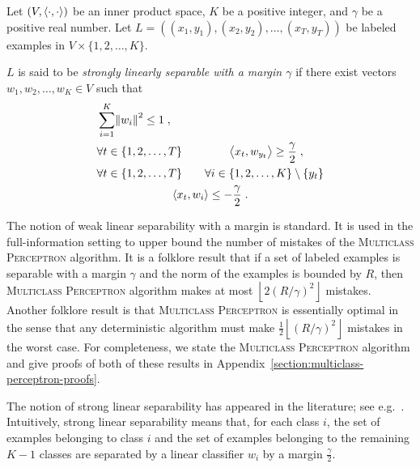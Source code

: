 \begin{definition}
\label{definition:strong-linear-separability}
Let $(V,\left\langle \cdot, \cdot \right\rangle)$ be an inner product space, $K$ be a positive
integer, and $\gamma$ be a positive real number. Let $L = ((x_1, y_1), (x_2,
y_2), \dots, (x_T, y_T))$ be labeled examples in $V \times \{1,2,\dots,K\}$.

$L$ is said to be \emph{strongly linearly separable with a
margin $\gamma$} if there exist vectors $w_1, w_2, \dots, w_K \in V$ such
that
\begin{align}
\label{equation:strong-linear-separability-1}
& \sum_{i=1}^K \norm{w_i}^2 \le 1 \; , \\
\label{equation:strong-linear-separability-2}
& \forall t \in \{1,2,\dots,T\} \qquad \qquad \left\langle x_t, w_{y_t} \right\rangle \ge \frac \gamma 2 \; , \\
\label{equation:strong-linear-separability-3}
& \begin{gathered}
\forall t \in \{1,2,\dots,T\} \qquad \forall i \in \{1,2,\dots, K\} \setminus \{y_t\} \\
\left\langle x_t, w_i \right\rangle \le - \frac \gamma 2 \; .
\end{gathered}
\end{align}
\end{definition}

The notion of weak linear separability with a margin is standard. It is used in
the full-information setting to upper bound the number of mistakes of the
\textsc{Multiclass Perceptron} algorithm. It is a folklore result that if a set
of labeled examples is separable with a margin $\gamma$ and the norm of the
examples is bounded by $R$, then \textsc{Multiclass Perceptron} algorithm makes
at most $\left\lfloor 2(R/\gamma)^2 \right \rfloor$ mistakes. Another folklore
result is that \textsc{Multiclass Perceptron} is essentially optimal in the
sense that any deterministic algorithm must make $\frac 1 2 \left\lfloor (R/\gamma)^2
\right \rfloor$ mistakes in the worst case.
For completeness, we state the
\textsc{Multiclass Perceptron} algorithm and give proofs of both of these
results in Appendix~\ref{section:multiclass-perceptron-proofs}.


The notion of strong linear separability has appeared in the literature; see
e.g.~\citet{Chen-Chen-Zhang-Chen-Zhang-2009}.
Intuitively, strong linear
separability means that, for each class $i$, the set of examples belonging to
class $i$ and the set of examples belonging to the remaining $K-1$ classes are
separated by a linear classifier $w_i$ by a margin $\frac \gamma 2$.


